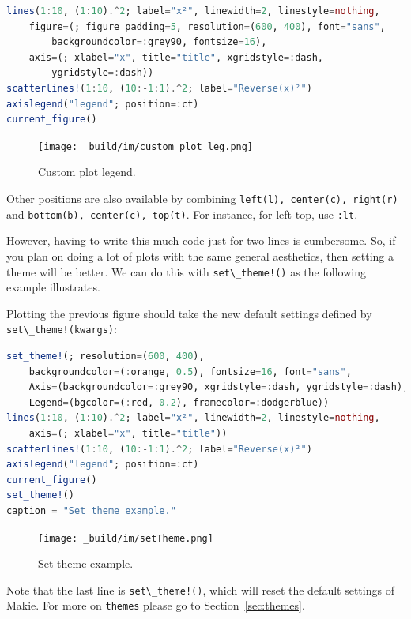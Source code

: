 \documentclass[
  notoc %
]{tufte-book}
\newcommand{\passthrough}[1]{#1}
\begin{document}
\begin{lstlisting}[language=Julia]
lines(1:10, (1:10).^2; label="x²", linewidth=2, linestyle=nothing,
    figure=(; figure_padding=5, resolution=(600, 400), font="sans",
        backgroundcolor=:grey90, fontsize=16),
    axis=(; xlabel="x", title="title", xgridstyle=:dash,
        ygridstyle=:dash))
scatterlines!(1:10, (10:-1:1).^2; label="Reverse(x)²")
axislegend("legend"; position=:ct)
current_figure()
\end{lstlisting}

\begin{figure}
\hypertarget{fig:custom_plot_leg}{%
\centering
\texttt{[image: \_build/im/custom\_plot\_leg.png]}
\caption{Custom plot legend.}\label{fig:custom_plot_leg}
}
\end{figure}

Other positions are also available by combining
\passthrough{\lstinline!left(l), center(c), right(r)!} and
\passthrough{\lstinline!bottom(b), center(c), top(t)!}. For instance,
for left top, use \passthrough{\lstinline!:lt!}.

However, having to write this much code just for two lines is
cumbersome. So, if you plan on doing a lot of plots with the same
general aesthetics, then setting a theme will be better. We can do this
with \passthrough{\lstinline"set\_theme!()"} as the following example
illustrates.

Plotting the previous figure should take the new default settings
defined by \passthrough{\lstinline"set\_theme!(kwargs)"}:

\begin{lstlisting}[language=Julia]
set_theme!(; resolution=(600, 400),
    backgroundcolor=(:orange, 0.5), fontsize=16, font="sans",
    Axis=(backgroundcolor=:grey90, xgridstyle=:dash, ygridstyle=:dash),
    Legend=(bgcolor=(:red, 0.2), framecolor=:dodgerblue))
lines(1:10, (1:10).^2; label="x²", linewidth=2, linestyle=nothing,
    axis=(; xlabel="x", title="title"))
scatterlines!(1:10, (10:-1:1).^2; label="Reverse(x)²")
axislegend("legend"; position=:ct)
current_figure()
set_theme!()
caption = "Set theme example."
\end{lstlisting}

\begin{figure}
\hypertarget{fig:setTheme}{%
\centering
\texttt{[image: \_build/im/setTheme.png]}
\caption{Set theme example.}\label{fig:setTheme}
}
\end{figure}

Note that the last line is \passthrough{\lstinline"set\_theme!()"},
which will reset the default settings of Makie. For more on
\passthrough{\lstinline!themes!} please go to Section~\ref{sec:themes}.
\end{document}
